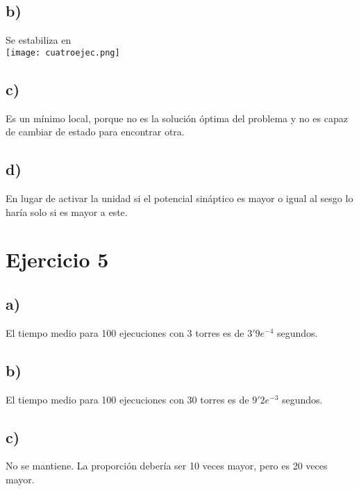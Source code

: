 \documentclass[12pt]{article}
\begin{document}
\subsection*{b)}
Se estabiliza en\\
\texttt{[image: cuatroejec.png]}

\subsection*{c)}
Es un m\'inimo local, porque no es la soluci\'on \'optima del problema y no es capaz de cambiar de estado para encontrar otra.

\subsection*{d)}
En lugar de activar la unidad si el potencial sin\'aptico es mayor o igual al sesgo lo har\'ia solo si es mayor a este.

\section*{Ejercicio 5}
\subsection*{a)}
El tiempo medio para 100 ejecuciones con 3 torres es de $3'9e^{-4}$ segundos.
\subsection*{b)}
El tiempo medio para 100 ejecuciones con 30 torres es de $9'2e^{-3}$ segundos.
\subsection*{c)}
No se mantiene. La proporci\'on deber\'ia ser 10 veces mayor, pero es 20 veces mayor.\\
 
\end{document}
